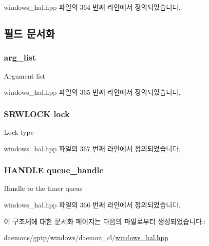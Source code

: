 windows\+\_\+hal.\+hpp 파일의 364 번째 라인에서 정의되었습니다.



\subsection{필드 문서화}
\subsubsection[{\texorpdfstring{arg\+\_\+list}{arg_list}}]{ arg\+\_\+list}\hypertarget{struct_timer_queue__t_abdc40944ec73781857b64230be2052df}{}\label{struct_timer_queue__t_abdc40944ec73781857b64230be2052df}
Argument list 

windows\+\_\+hal.\+hpp 파일의 365 번째 라인에서 정의되었습니다.

\subsubsection[{\texorpdfstring{lock}{lock}}]{\setlength{\rightskip}{0pt plus 5cm}S\+R\+W\+L\+O\+CK lock}\hypertarget{struct_timer_queue__t_afed18a2dbad108768defb51810a7a760}{}\label{struct_timer_queue__t_afed18a2dbad108768defb51810a7a760}
Lock type 

windows\+\_\+hal.\+hpp 파일의 367 번째 라인에서 정의되었습니다.

\subsubsection[{\texorpdfstring{queue\+\_\+handle}{queue_handle}}]{\setlength{\rightskip}{0pt plus 5cm}H\+A\+N\+D\+LE queue\+\_\+handle}\hypertarget{struct_timer_queue__t_a0891fe4ac1705d165bbd1511a826cb6a}{}\label{struct_timer_queue__t_a0891fe4ac1705d165bbd1511a826cb6a}
Handle to the timer queue 

windows\+\_\+hal.\+hpp 파일의 366 번째 라인에서 정의되었습니다.



이 구조체에 대한 문서화 페이지는 다음의 파일로부터 생성되었습니다.\+:\begin{DoxyCompactItemize}
\item 
daemons/gptp/windows/daemon\+\_\+cl/\hyperlink{windows__hal_8hpp}{windows\+\_\+hal.\+hpp}\end{DoxyCompactItemize}
